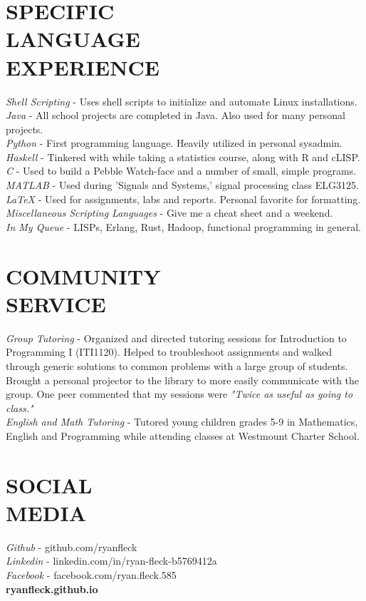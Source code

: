 \documentclass[margin]{res}
\begin{document}
\begin{resume}
\section{SPECIFIC \\ LANGUAGE \\ EXPERIENCE} 
{\sl Shell Scripting} - Uses shell scripts to initialize and automate Linux installations.\\       
{\sl Java} - All school projects are completed in Java. Also used for many personal projects.\\
{\sl Python} - First programming language. Heavily utilized in personal sysadmin.\\
{\sl Haskell} -  Tinkered with while taking a statistics course, along with R and cLISP.\\
{\sl C} - Used to build a Pebble Watch-face and a number of small, simple programs.\\
{\sl MATLAB} - Used during 'Signals and Systems,' signal processing class ELG3125.\\
{\sl LaTeX} -  Used for assignments, labs and reports. Personal favorite for formatting.\\
{\sl Miscellaneous Scripting Languages} -  Give me a cheat sheet and a weekend.\\
{\sl In My Queue} - LISPs, Erlang, Rust, Hadoop, functional programming in general.




 \section{COMMUNITY \\ SERVICE}  {\sl Group Tutoring} - Organized and directed tutoring sessions for Introduction to Programming I (ITI1120). Helped to troubleshoot assignments and walked through generic solutions to common problems with a large group of students. Brought a personal projector to the library to more easily communicate with the group. One peer commented that my sessions were {\sl "Twice as useful as going to class."}\\
{\sl English and Math Tutoring} - Tutored young children grades 5-9 in Mathematics, English and Programming while attending classes at Westmount Charter School.


           	
\section{SOCIAL \\ MEDIA}        
{\sl Github} - github.com/ryanfleck \\
{\sl Linkedin} - linkedin.com/in/ryan-fleck-b5769412a \\
{\sl Facebook} - facebook.com/ryan.fleck.585 \\
 
 \vfill
 {\hfill\large\bf ryanfleck.github.io}
 

\end{resume}
\end{document}

